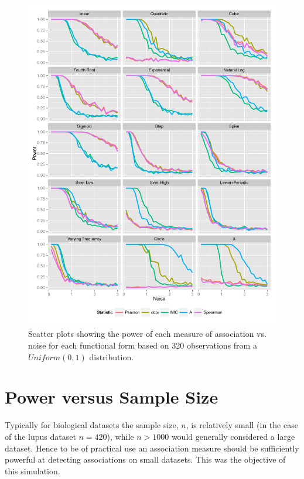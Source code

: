 \documentclass[a4paper, 12pt]{report}
\begin{document}
\begin{figure}[H]
\begin{centering}
\includegraphics[width=\textwidth]{powerNoiseUN.pdf}
\caption{Scatter plots showing the power of each measure of association vs. noise for each functional form based on 320 observations from a $Uniform(0,1)$ distribution.} 
\label{F:powerNU}
\end{centering}
\end{figure}

\section{Power versus Sample Size}
Typically for biological datasets the sample size, $n$, is relatively small (in the case of the lupus dataset $n = 420$), while $n > 1000$ would generally considered a large dataset. Hence to be of practical use an association measure should be sufficiently powerful at detecting associations on small datasets. This was the objective of this simulation.  
\end{document}
